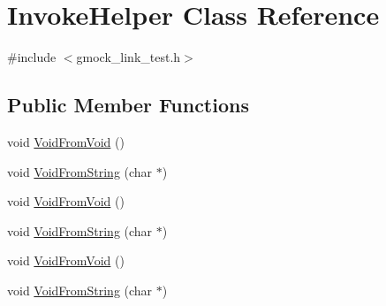 \hypertarget{class_invoke_helper}{}\section{Invoke\+Helper Class Reference}
\label{class_invoke_helper}


{\ttfamily \#include $<$gmock\+\_\+link\+\_\+test.\+h$>$}

\subsection*{Public Member Functions}
\begin{DoxyCompactItemize}
\item 
void \mbox{\hyperlink{class_invoke_helper_a6371bcb64a8f01093f6fdef60776a031}{Void\+From\+Void}} ()
\item 
void \mbox{\hyperlink{class_invoke_helper_a89f02dc384e6b5a7d935b7ea0a81cc9e}{Void\+From\+String}} (char $\ast$)
\item 
void \mbox{\hyperlink{class_invoke_helper_a6371bcb64a8f01093f6fdef60776a031}{Void\+From\+Void}} ()
\item 
void \mbox{\hyperlink{class_invoke_helper_a89f02dc384e6b5a7d935b7ea0a81cc9e}{Void\+From\+String}} (char $\ast$)
\item 
void \mbox{\hyperlink{class_invoke_helper_a6371bcb64a8f01093f6fdef60776a031}{Void\+From\+Void}} ()
\item 
void \mbox{\hyperlink{class_invoke_helper_a89f02dc384e6b5a7d935b7ea0a81cc9e}{Void\+From\+String}} (char $\ast$)
\end{DoxyCompactItemize}
